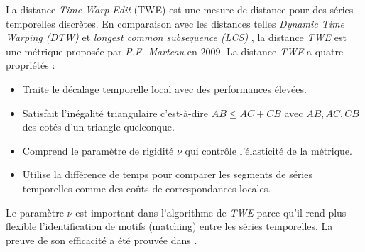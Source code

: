 La distance {\em Time Warp Edit} (TWE) est une mesure de distance pour des s\'eries temporelles  discr\`etes. En comparaison avec les distances telles {\em Dynamic Time Warping (DTW)} \cite{muller2007dynamicDTW} et {\em longest common subsequence (LCS)} \cite{greenberg2002fastLCS}, la distance {\em TWE} est une m\'etrique propos\'ee par {\em P.F. Marteau} en $2009$. 
La distance {\em TWE} a quatre propri\'et\'es :
\begin{itemize}
	\item Traite le d\'ecalage temporelle local avec des performances \'elev\'ees.
	\item Satisfait l'in\'egalit\'e triangulaire c'est-\`a-dire $AB \le AC+CB$ avec $AB,AC, CB$ des cot\'es d'un triangle quelconque.
	\item Comprend le param\`etre de rigidit\'e $\nu$ qui contr\^ole l'\'elasticit\'e de la m\'etrique.
	\item Utilise la diff\'erence de temps pour comparer les segments de s\'eries temporelles comme des co\^uts de correspondances locales. 
\end{itemize}
Le param\`etre $\nu$ est important dans l'algorithme de {\em TWE} parce qu'il rend plus flexible l'identification de motifs (matching) entre les s\'eries temporelles. 
La preuve de son efficacit\'e a \'et\'e prouv\'ee dans \cite{marteau2009time}.

